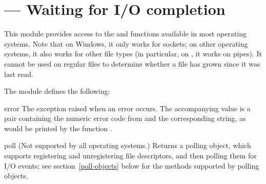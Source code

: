 \section{ ---
         Waiting for I/O completion}



This module provides access to the 
and  functions
available in most operating systems.  Note that on Windows, it only
works for sockets; on other operating systems, it also works for other
file types (in particular, on \UNIX, it works on pipes).  It cannot
be used on regular files to determine whether a file has grown since
it was last read.

The module defines the following:

\begin{excdesc}{error}
The exception raised when an error occurs.  The accompanying value is
a pair containing the numeric error code from  and the
corresponding string, as would be printed by the \C{} function
.
\end{excdesc}

\begin{funcdesc}{poll}{}
(Not supported by all operating systems.)  Returns a polling object,
which supports registering and unregistering file descriptors, and
then polling them for I/O events;
see section~\ref{poll-objects} below for the methods supported by
polling objects.
\end{funcdesc}


